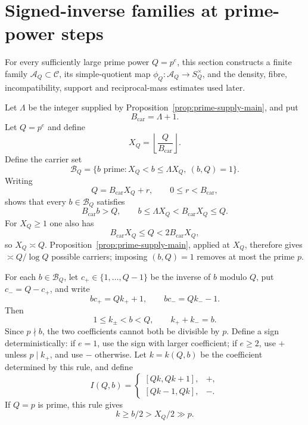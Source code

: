 \section{Signed-inverse families at prime-power steps}
\label{sec:signed-inverse}

For every sufficiently large prime power $Q=p^e$, this section constructs a finite family $\mathcal A_Q\subset\mathcal C$, its simple-quotient map $\phi_Q:\mathcal A_Q\to S_Q^\times$, and the density, fibre, incompatibility, support and reciprocal-mass estimates used later.

Let $\Lambda$ be the integer supplied by Proposition~\ref{prop:prime-supply-main}, and put
\[
B_{\mathrm{car}}=\Lambda+1.
\]
Let $Q=p^e$ and define
\begin{equation}\label{eq:carrier-base}
X_Q=\left\lfloor\frac{Q}{B_{\mathrm{car}}}\right\rfloor.
\end{equation}
Define the carrier set
\begin{equation}\label{eq:carrier-band}
\mathscr B_Q=
\{b\text{ prime}:X_Q<b\le\Lambda X_Q,\ (b,Q)=1\}.
\end{equation}
Writing
\[
Q=B_{\mathrm{car}}X_Q+r,
\qquad 0\le r<B_{\mathrm{car}},
\]
shows that every $b\in\mathscr B_Q$ satisfies
\begin{equation}\label{eq:carrier-exact}
B_{\mathrm{car}}b>Q,
\qquad
b\le\Lambda X_Q<B_{\mathrm{car}}X_Q\le Q.
\end{equation}
For $X_Q\ge1$ one also has
\[
B_{\mathrm{car}}X_Q\le Q<2B_{\mathrm{car}}X_Q,
\]
so $X_Q\asymp Q$.  Proposition~\ref{prop:prime-supply-main}, applied at $X_Q$, therefore gives $\asymp Q/\log Q$ possible carriers; imposing $(b,Q)=1$ removes at most the prime $p$.

For each $b\in\mathscr B_Q$, let $c_+\in\{1,\ldots,Q-1\}$ be the inverse of $b$ modulo $Q$, put $c_-=Q-c_+$, and write
\begin{equation}\label{eq:signed-inverse}
bc_+=Qk_++1,
\qquad
bc_-=Qk_--1.
\end{equation}
Then
\[
1\le k_\pm<b<Q,
\qquad
k_++k_-=b.
\]
Since $p\nmid b$, the two coefficients cannot both be divisible by $p$.  Define a sign deterministically: if $e=1$, use the sign with larger coefficient; if $e\ge2$, use $+$ unless $p\mid k_+$, and use $-$ otherwise.  Let $k=k(Q,b)$ be the coefficient determined by this rule, and define
\begin{equation}\label{eq:signed-block}
I(Q,b)=
\begin{cases}
[Qk,Qk+1],&+,\\
[Qk-1,Qk],&-.
\end{cases}
\end{equation}
If $Q=p$ is prime, this rule gives
\begin{equation}\label{eq:atomic-k-lower}
k\ge b/2>X_Q/2\gg p.
\end{equation}

